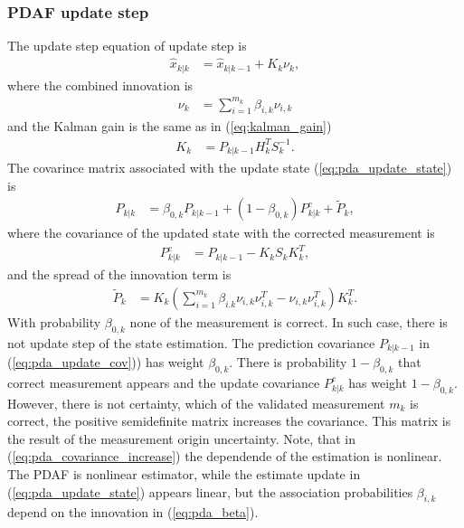 \subsubsection{PDAF update step}
The update step equation of update step is
\begin{align}
    \hat{x}_{k|k} &= \hat{x}_{k|k-1} + K_k \nu_k, \label{eq:pda_update_state}
\end{align}
where the combined innovation is
\begin{align}
    \nu_k &= \sum_{i=1}^{m_k} \beta_{i,k} \nu_{i,k}
\end{align}
and the Kalman gain is the same as in (\ref{eq:kalman_gain})
\begin{align}
    K_k &= P_{k|k-1} H_k^T S_k^{-1}.
\end{align}
The covarince matrix associated with the update state (\ref{eq:pda_update_state}) is
\begin{align}
    P_{k|k} &= \beta_{0,k} P_{k|k-1} + (1-\beta_{0,k}) P_{k|k}^c + \tilde{P}_k,
\end{align}
where the covariance of the updated state with the corrected measurement is
\begin{align}
    P_{k|k}^c &= P_{k|k-1} - K_k S_k K_{k}^T, \label{eq:pda_update_cov}
\end{align}
and the spread of the innovation term is
\begin{align}
    \tilde{P}_k &= K_k (\sum_{i=1}^{m_k} \beta_{i.k} \nu_{i,k} \nu_{i,k}^T - \nu_{i,k} \nu_{i,k}^T) K_k^T. \label{eq:pda_covariance_increase}
\end{align}
With probability $\beta_{0,k}$ none of the measurement is correct. In such case, there is not update step of the
state estimation. The prediction covariance $P_{k|k-1}$ in (\ref{eq:pda_update_cov})) has weight $\beta_{0,k}$. There is probability $1-\beta_{0,k}$ that correct measurement appears and the update covariance $P_{k|k}^c$ has weight $1-\beta_{0,k}$. However, there is not certainty, which of the validated measurement $m_k$ is correct, the positive semidefinite matrix increases the covariance. This matrix is the result of the measurement origin uncertainty. Note, that in (\ref{eq:pda_covariance_increase}) the dependende of the estimation is nonlinear. The PDAF is nonlinear estimator, while the estimate update in (\ref{eq:pda_update_state}) appears linear, but the association probabilities $\beta_{i,k}$ depend on the innovation in (\ref{eq:pda_beta}).



